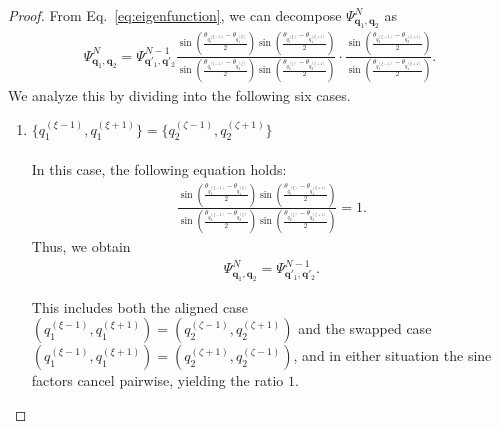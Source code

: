 \documentclass[
amsmath,amssymb,
]{revtex4-2}
\begin{document}
\begin{proof}
%
From Eq.~\eqref{eq:eigenfunction}, we can decompose $\Psi^N_{\bm{q}_1, \bm{q}_2}$ as
%
\begin{align}
    \Psi^N_{\bm{q}_1, \bm{q}_2}
    = \Psi^{N-1}_{\bm{q}'_1, \bm{q}'_2}\frac{\sin\left( \frac{\theta_{q_1^{(\xi-1)}} - \theta_{q_1^{(\xi)}}}{2} \right)\sin\left( \frac{\theta_{q_1^{(\xi)}} - \theta_{q_1^{(\xi+1)}}}{2} \right)}
           {\sin\left( \frac{\theta_{q_2^{(\zeta-1)}} - \theta_{q_2^{(\zeta)}}}{2} \right)\sin\left( \frac{\theta_{q_2^{(\zeta)}} - \theta_{q_2^{(\zeta+1)}}}{2} \right)}\cdot \frac{\sin\left( \frac{\theta_{q_2^{(\zeta-1)}} - \theta_{q_2^{(\zeta+1)}}}{2} \right)}{\sin\left( \frac{\theta_{q_1^{(\xi-1)}} - \theta_{q_1^{(\xi+1)}}}{2} \right)}.
\end{align}
%
We analyze this by dividing into the following six cases. 
%
\begin{enumerate}
\item[\textit{Case.1:}] $\{{q_1^{(\xi-1)}},{q_1^{(\xi+1)}}\} = \{{q_2^{(\zeta-1)}}, {q_2^{(\zeta+1)}}\}$\\ \\
In this case, the following equation holds: 
\begin{align}
    \frac{\sin\left( \frac{\theta_{q_1^{(\xi-1)}} - \theta_{q_1^{(\xi)}}}{2} \right)\sin\left( \frac{\theta_{q_1^{(\xi)}} - \theta_{q_1^{(\xi+1)}}}{2} \right)}
           {\sin\left( \frac{\theta_{q_2^{(\zeta-1)}} - \theta_{q_2^{(\zeta)}}}{2} \right)\sin\left( \frac{\theta_{q_2^{(\zeta)}} - \theta_{q_2^{(\zeta+1)}}}{2} \right)} = 1.
\end{align}
Thus, we obtain
\begin{align}
    \Psi^N_{\bm{q}_1, \bm{q}_2} = \Psi^{N-1}_{\bm{q}'_1, \bm{q}'_2}.
\end{align}

This includes both the aligned case $(q_1^{(\xi-1)},q_1^{(\xi+1)})=(q_2^{(\zeta-1)},q_2^{(\zeta+1)})$ and the swapped case $(q_1^{(\xi-1)},q_1^{(\xi+1)})=(q_2^{(\zeta+1)},q_2^{(\zeta-1)})$, and in either situation the sine factors cancel pairwise, yielding the ratio $1$.


\end{enumerate}
\end{proof}
\end{document}
